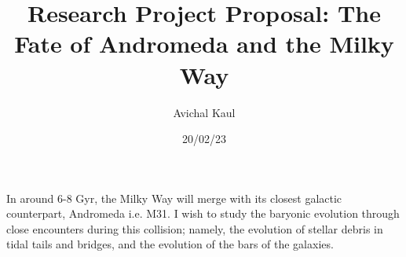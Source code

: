 \documentclass{article}
\title{Research Project Proposal: The Fate of Andromeda and the Milky Way}
\author{Avichal Kaul}
\date{20/02/23}
\begin{document}
  \maketitle
  In around 6-8 Gyr, the Milky Way will merge with its closest galactic counterpart, Andromeda i.e. M31. I wish to study the baryonic evolution through close encounters during this collision; namely, the evolution of stellar debris in tidal tails and bridges, and the evolution of the bars of the galaxies. 
\end{document}
